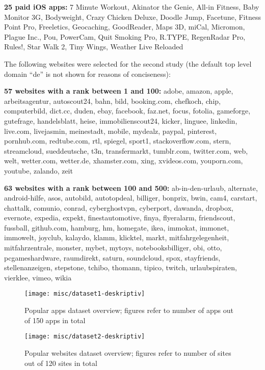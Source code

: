 \documentclass{llncs}
\begin{document}
\medskip

\noindent\textbf{25 paid iOS apps:} 7 Minute Workout, Akinator the Genie, All-in Fitness, Baby
Monitor 3G, Bodyweight, Crazy Chicken Deluxe, Doodle Jump, Facetune,
Fitness Point Pro, Freeletics, Geocaching, GoodReader, Maps 3D, miCal,
Micromon, Plague Inc., Pou, PowerCam, Quit Smoking Pro, R.TYPE, RegenRadar
Pro, Rules!, Star Walk 2, Tiny Wings, Weather Live Reloaded

\clearpage

\noindent The following websites were selected for the second study (the default top level domain ``de'' is not shown for reasons of conciseness):

\medskip

\noindent\textbf{57 websites with a rank between 1 and 100:}
adobe, amazon, apple, arbeits\-agentur, autoscout24, bahn, bild, booking.com, chefkoch, chip, computerbild, dict.cc, duden, ebay, facebook, faz.net, focus, fotolia, gameforge, gutefrage, handelsblatt, heise, immobilienscout24, kicker, linguee, linkedin, live.com, livejasmin, meinestadt, mobile, mydealz, paypal, pinterest, pornhub.com, redtube.com, rtl, spiegel, sport1, stackoverflow.com, stern, streamcloud, sueddeutsche, t3n, transfermarkt, tumblr.com, twitter.com, web, welt, wetter.com, wetter.de, xhamster.com, xing, xvideos.com, youporn.com, youtube, zalando, zeit

\medskip

\noindent\textbf{63 websites with a rank between 100 and 500:}
ab-in-den-urlaub, alternate, android-hilfe, asos, autobild, autotopdeal, billiger, bonprix, bwin, cam4, carstart, chattalk, comunio, conrad, cyberghostvpn, cyberport, dawanda, dropbox, evernote, expedia, expekt, finestautomotive, finya, flyeralarm, friendscout, fussball, github.com, hamburg, hm, homegate, ikea, immokat, immonet, immo\-welt, joyclub, kalaydo, klamm, klicktel, markt, mitfahrgelegenheit, mitfahrzentrale, monster, mybet, mytoys, notebooksbilliger, obi, otto, pcgameshardware, raumdirekt, saturn, soundcloud, spox, stayfriends, stellenanzeigen, stepstone, tchibo, thomann, tipico, twitch, urlaubspiraten, vierklee, vimeo, wikia



\begin{figure}[p]
\centering
 \texttt{[image: misc/dataset1-deskriptiv]}
 \caption{\label{d1-desc}Popular apps dataset overview; figures refer to number of apps out of 150 apps in total}
\end{figure}


\begin{figure}[p]
\centering
 \texttt{[image: misc/dataset2-deskriptiv]}
 \caption{\label{d2-desc}Popular websites dataset overview; figures refer to number of sites out of 120 sites in total}
\end{figure}
\end{document}
